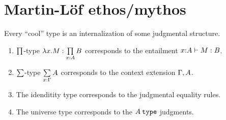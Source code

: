 \documentclass[11pt]{article}
\begin{document}
\section{Martin-L\"of ethos/mythos}
Every ``cool'' type is an internalization of some judgmental structure.
\begin{enumerate}
\item $\dfuntype$-type $\oftype{\lam{x}{M}}{\dfuntype{x}{A}{B}}$
  corresponds to the entailment $\oftype{x{:}A}{M}{B}$.
\item $\dpairtype$-type $\dpairtype{x}{\ctx}{A}$
  corresponds to the context extension $\Gamma, {A}$.
\item The idenditity type corresponds to the judgmental equality rules.
\item The universe type corresponds to the $\istype{A}$ judgments.
\end{enumerate}
\end{document}
